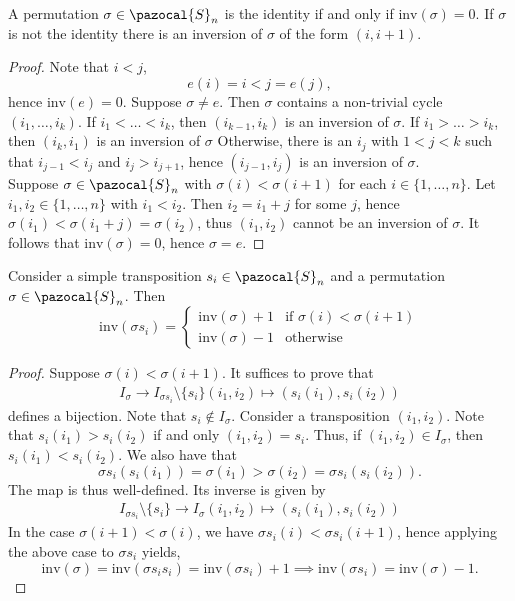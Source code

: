 \begin{lemma}
    A permutation $\sigma\in \pazocal{S}_n$ is the identity if and only if $\mathrm{inv}(\sigma)=0$. If $\sigma$ is not the identity there is an inversion of $\sigma$ of the form $(i,i+1)$. 
\end{lemma}
\begin{proof}
    Note that $i<j$, 
        $$
            e(i)=i<j =e(j),
        $$
    hence $\mathrm{inv}(e)=0$. Suppose $\sigma\neq e$. Then $\sigma$ contains a non-trivial cycle $(i_1,\dots,i_k)$. If $i_1<\dots< i_k$, then $(i_{k-1},i_k)$ is an inversion of $\sigma$. If $i_1>\dots>i_k$, then $(i_k,i_1)$ is an inversion of $\sigma$ Otherwise, there is an $i_j$ with $1<j<k$ such that $i_{j-1}<i_{j}$ and $i_j>i_{j+1}$, hence $(i_{j-1},i_j)$ is an inversion of $\sigma$.\\
    Suppose $\sigma\in \pazocal{S}_n$ with $\sigma(i)<\sigma(i+1)$ for each $i\in\{1,\dots,n\}$. Let $i_1,i_2\in \{1,\dots,n\}$ with $i_1<i_2$. Then $i_2 = i_1+j$ for some $j$, hence $\sigma(i_1)< \sigma(i_1+j)=\sigma(i_2)$, thus $(i_1,i_2)$ cannot be an inversion of $\sigma$. It follows that $\mathrm{inv}(\sigma)=0$, hence $\sigma=e$.   
\end{proof}
\begin{lemma}
    Consider a simple transposition $s_i\in \pazocal{S}_n$ and a permutation $\sigma\in \pazocal{S}_n$. Then 
    $$
        \mathrm{inv}(\sigma s_i)=
        \begin{cases}
            \mathrm{inv}(\sigma)+1 & \text{if } \sigma(i)<\sigma(i+1)\\
            \mathrm{inv}(\sigma)-1 & \text{otherwise}
        \end{cases}
    $$
\end{lemma}
\begin{proof}
    Suppose $\sigma(i)<\sigma(i+1)$. It suffices to prove that  
    \begin{gather*}
        I_\sigma \rightarrow I_{\sigma s_i}\setminus \{s_i\}
        (i_1,i_2)\mapsto (s_i(i_1),s_i(i_2))
    \end{gather*}    
    defines a bijection.
    Note that $s_i \notin I_\sigma$. Consider a transposition $(i_1,i_2)$. Note that $s_i(i_1) > s_i(i_2)$ if and only $(i_1,i_2)=s_i$. Thus, if $(i_1,i_2)\in I_\sigma$, then $s_i(i_1)<s_i(i_2)$. We also have that  
    $$
        \sigma s_i(s_i(i_1)) = \sigma( i_1) > \sigma(i_2)=\sigma s_i (s_i(i_2)).
    $$ 
    The map is thus well-defined. Its inverse is given by 
    \begin{gather*}
         I_{\sigma s_i}\setminus \{s_i\} \rightarrow I_\sigma
        (i_1,i_2)\mapsto (s_i(i_1),s_i(i_2))
    \end{gather*}
    In the case $\sigma(i+1) <\sigma(i)$, we have $\sigma s_i(i)< \sigma s_i(i+1)$, hence applying the above case to $\sigma s_i$ yields, 
    $$
        \mathrm{inv}(\sigma)=\mathrm{inv}(\sigma s_i s_i) = \mathrm{inv}(\sigma s_i)+1 \implies \mathrm{inv}(\sigma s_i)  = \mathrm{inv}(\sigma)-1. 
    $$
\end{proof}
